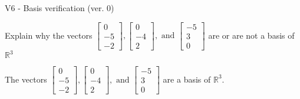 \begin{exercise}
  \begin{exerciseTitle}V6 - Basis verification (ver. 0)\end{exerciseTitle}
  \begin{exerciseStatement}
    Explain why the vectors \(\left[\begin{array}{r}
0 \\
-5 \\
-2
\end{array}\right] , \left[\begin{array}{r}
0 \\
-4 \\
2
\end{array}\right] , \text{ and } \left[\begin{array}{r}
-5 \\
3 \\
0
\end{array}\right]\) are or are not a basis of \(\mathbb{R}^3\)	


  \end{exerciseStatement}
  \begin{exerciseAnswer}
   The vectors \(\left[\begin{array}{r}
0 \\
-5 \\
-2
\end{array}\right] , \left[\begin{array}{r}
0 \\
-4 \\
2
\end{array}\right] , \text{ and } \left[\begin{array}{r}
-5 \\
3 \\
0
\end{array}\right]\) 
  	 are  a basis of \(\mathbb{R}^3\).
  


  \end{exerciseAnswer}
\end{exercise}